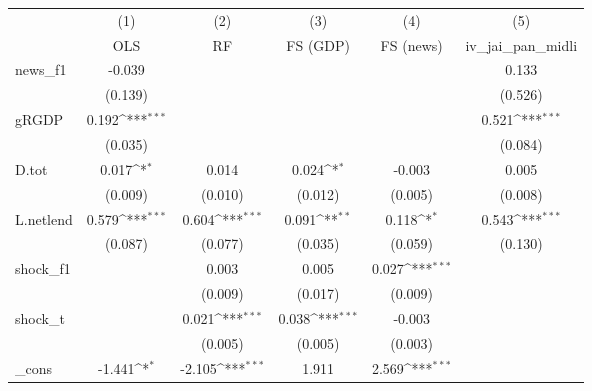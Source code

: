 {
\def\sym#1{\ifmmode^{#1}\else\(^{#1}\)\fi}
\begin{tabular}{l*{5}{c}}
\toprule
            &\multicolumn{1}{c}{(1)}&\multicolumn{1}{c}{(2)}&\multicolumn{1}{c}{(3)}&\multicolumn{1}{c}{(4)}&\multicolumn{1}{c}{(5)}\\
            &\multicolumn{1}{c}{OLS}&\multicolumn{1}{c}{RF}&\multicolumn{1}{c}{FS (GDP)}&\multicolumn{1}{c}{FS (news)}&\multicolumn{1}{c}{iv\_jai\_pan\_midli}\\
\midrule
news\_f1     &      -0.039         &                     &                     &                     &       0.133         \\
            &     (0.139)         &                     &                     &                     &     (0.526)         \\
\addlinespace
gRGDP       &       0.192\sym{***}&                     &                     &                     &       0.521\sym{***}\\
            &     (0.035)         &                     &                     &                     &     (0.084)         \\
\addlinespace
D.tot       &       0.017\sym{*}  &       0.014         &       0.024\sym{*}  &      -0.003         &       0.005         \\
            &     (0.009)         &     (0.010)         &     (0.012)         &     (0.005)         &     (0.008)         \\
\addlinespace
L.netlend   &       0.579\sym{***}&       0.604\sym{***}&       0.091\sym{**} &       0.118\sym{*}  &       0.543\sym{***}\\
            &     (0.087)         &     (0.077)         &     (0.035)         &     (0.059)         &     (0.130)         \\
\addlinespace
shock\_f1    &                     &       0.003         &       0.005         &       0.027\sym{***}&                     \\
            &                     &     (0.009)         &     (0.017)         &     (0.009)         &                     \\
\addlinespace
shock\_t     &                     &       0.021\sym{***}&       0.038\sym{***}&      -0.003         &                     \\
            &                     &     (0.005)         &     (0.005)         &     (0.003)         &                     \\
\addlinespace
\_cons      &      -1.441\sym{*}  &      -2.105\sym{***}&       1.911         &       2.569\sym{***}&                     \\

\end{tabular}}
